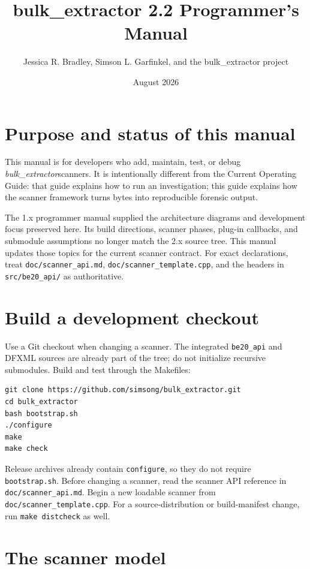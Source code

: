 \documentclass[11pt]{article}
\title{bulk\_extractor 2.2 Programmer's Manual}
\author{Jessica R. Bradley, Simson L. Garfinkel, and the bulk\_extractor project}
\date{August 2026}
\newcommand{\bulk}{\textit{bulk\_extractor}}
\newcommand{\code}[1]{\texttt{#1}}
\begin{document}
\maketitle
\tableofcontents
\newpage

\section{Purpose and status of this manual}

This manual is for developers who add, maintain, test, or debug
\bulk scanners. It is intentionally different from the Current Operating
Guide: that guide explains how to run an investigation; this guide explains
how the scanner framework turns bytes into reproducible forensic output.

The 1.x programmer manual supplied the architecture diagrams and development
focus preserved here. Its build directions, scanner phases, plug-in callbacks,
and submodule assumptions no longer match the 2.x source tree. This manual
updates those topics for the current scanner contract. For exact declarations,
treat \code{doc/scanner\_api.md}, \code{doc/scanner\_template.cpp}, and the
headers in \code{src/be20\_api/} as authoritative.

\section{Build a development checkout}

Use a Git checkout when changing a scanner. The integrated \code{be20\_api}
and DFXML sources are already part of the tree; do not initialize recursive
submodules. Build and test through the Makefiles:

\begin{Verbatim}
git clone https://github.com/simsong/bulk_extractor.git
cd bulk_extractor
bash bootstrap.sh
./configure
make
make check
\end{Verbatim}

Release archives already contain \code{configure}, so they do not require
\code{bootstrap.sh}. Before changing a scanner, read the scanner API reference
in \code{doc/scanner\_api.md}. Begin a new loadable scanner from
\code{doc/scanner\_template.cpp}. For a source-distribution or build-manifest
change, run \code{make distcheck} as well.

\section{The scanner model}
\end{document}
